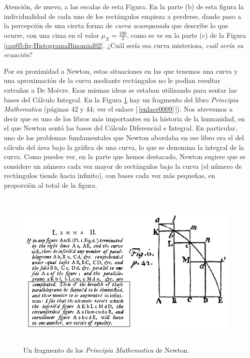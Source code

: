 Atención, de nuevo, a las escalas de esta Figura. En la parte (b) de esta figura la individualidad
de cada uno de los rectángulos empieza a perderse, dando paso a la percepción de una cierta forma
de {\em curva acampanada} que describe lo que ocurre, con una cima en el valor
$\mu_X=\frac{100}{3}$, como se ve en la parte (c) de la Figura
\ref{cap05:fig:HistogramaBinomial02}. ¿Cuál sería esa curva misteriosa, {\em cuál sería su
ecuación}?

Por su proximidad a Newton, estas situaciones en las que tenemos una curva y una aproximación de la
curva mediante rectángulos no le podían resultar extrañas a De Moivre. Esas mismas ideas se estaban
utilizando para sentar las bases del Cálculo Integral. En la Figura
\ref{cap05:fig:FragmentoPrincipiaNewton} hay un fragmento del libro
{\em Principia Mathematica} (páginas 42 y 44; ver el
enlace [\,\ref{enlace0009}\,]\label{enlace0009a}). Nos atrevemos a decir que es uno de
los libros más importantes en la historia de la humanidad, en el que Newton sentó las bases del
Cálculo Diferencial e Integral. En particular, uno de los problemas fundamentales que Newton
abordaba en ese libro era el del cálculo del área bajo la gráfica de una curva, lo que se denomina
la {\sf integral} de la curva. Como puedes ver, en la parte que hemos destacado, Newton sugiere que
se considere un número cada vez mayor de rectángulos bajo la curva (el número de rectángulos tiende
hacia infinito), con bases cada vez más pequeñas, en proporción al total de la figura.
\begin{figure}[bhtp]
\begin{center}
\includegraphics[height=8cm]{../fig/Cap05-NewtonPrincipia.png}
\caption{Un fragmento de los {\em Principia Mathematica} de Newton.}
\label{cap05:fig:FragmentoPrincipiaNewton}
\end{center}
\end{figure}

